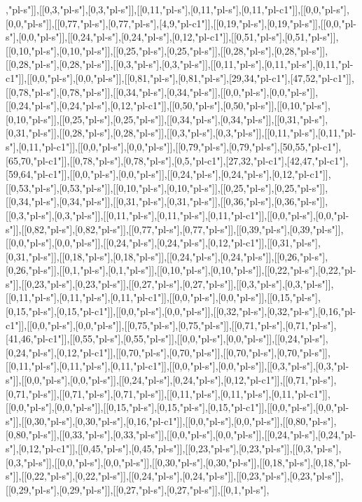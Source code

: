 ,"pl-s"]],[[0,3,"pl-s"],[0,3,"pl-s"]],[[0,11,"pl-s"],[0,11,"pl-s"],[0,11,"pl-c1"]],[[0,0,"pl-s"],[0,0,"pl-s"]],[[0,77,"pl-s"],[0,77,"pl-s"],[4,9,"pl-c1"]],[[0,19,"pl-s"],[0,19,"pl-s"]],[[0,0,"pl-s"],[0,0,"pl-s"]],[[0,24,"pl-s"],[0,24,"pl-s"],[0,12,"pl-c1"]],[[0,51,"pl-s"],[0,51,"pl-s"]],[[0,10,"pl-s"],[0,10,"pl-s"]],[[0,25,"pl-s"],[0,25,"pl-s"]],[[0,28,"pl-s"],[0,28,"pl-s"]],[[0,28,"pl-s"],[0,28,"pl-s"]],[[0,3,"pl-s"],[0,3,"pl-s"]],[[0,11,"pl-s"],[0,11,"pl-s"],[0,11,"pl-c1"]],[[0,0,"pl-s"],[0,0,"pl-s"]],[[0,81,"pl-s"],[0,81,"pl-s"],[29,34,"pl-c1"],[47,52,"pl-c1"]],[[0,78,"pl-s"],[0,78,"pl-s"]],[[0,34,"pl-s"],[0,34,"pl-s"]],[[0,0,"pl-s"],[0,0,"pl-s"]],[[0,24,"pl-s"],[0,24,"pl-s"],[0,12,"pl-c1"]],[[0,50,"pl-s"],[0,50,"pl-s"]],[[0,10,"pl-s"],[0,10,"pl-s"]],[[0,25,"pl-s"],[0,25,"pl-s"]],[[0,34,"pl-s"],[0,34,"pl-s"]],[[0,31,"pl-s"],[0,31,"pl-s"]],[[0,28,"pl-s"],[0,28,"pl-s"]],[[0,3,"pl-s"],[0,3,"pl-s"]],[[0,11,"pl-s"],[0,11,"pl-s"],[0,11,"pl-c1"]],[[0,0,"pl-s"],[0,0,"pl-s"]],[[0,79,"pl-s"],[0,79,"pl-s"],[50,55,"pl-c1"],[65,70,"pl-c1"]],[[0,78,"pl-s"],[0,78,"pl-s"],[0,5,"pl-c1"],[27,32,"pl-c1"],[42,47,"pl-c1"],[59,64,"pl-c1"]],[[0,0,"pl-s"],[0,0,"pl-s"]],[[0,24,"pl-s"],[0,24,"pl-s"],[0,12,"pl-c1"]],[[0,53,"pl-s"],[0,53,"pl-s"]],[[0,10,"pl-s"],[0,10,"pl-s"]],[[0,25,"pl-s"],[0,25,"pl-s"]],[[0,34,"pl-s"],[0,34,"pl-s"]],[[0,31,"pl-s"],[0,31,"pl-s"]],[[0,36,"pl-s"],[0,36,"pl-s"]],[[0,3,"pl-s"],[0,3,"pl-s"]],[[0,11,"pl-s"],[0,11,"pl-s"],[0,11,"pl-c1"]],[[0,0,"pl-s"],[0,0,"pl-s"]],[[0,82,"pl-s"],[0,82,"pl-s"]],[[0,77,"pl-s"],[0,77,"pl-s"]],[[0,39,"pl-s"],[0,39,"pl-s"]],[[0,0,"pl-s"],[0,0,"pl-s"]],[[0,24,"pl-s"],[0,24,"pl-s"],[0,12,"pl-c1"]],[[0,31,"pl-s"],[0,31,"pl-s"]],[[0,18,"pl-s"],[0,18,"pl-s"]],[[0,24,"pl-s"],[0,24,"pl-s"]],[[0,26,"pl-s"],[0,26,"pl-s"]],[[0,1,"pl-s"],[0,1,"pl-s"]],[[0,10,"pl-s"],[0,10,"pl-s"]],[[0,22,"pl-s"],[0,22,"pl-s"]],[[0,23,"pl-s"],[0,23,"pl-s"]],[[0,27,"pl-s"],[0,27,"pl-s"]],[[0,3,"pl-s"],[0,3,"pl-s"]],[[0,11,"pl-s"],[0,11,"pl-s"],[0,11,"pl-c1"]],[[0,0,"pl-s"],[0,0,"pl-s"]],[[0,15,"pl-s"],[0,15,"pl-s"],[0,15,"pl-c1"]],[[0,0,"pl-s"],[0,0,"pl-s"]],[[0,32,"pl-s"],[0,32,"pl-s"],[0,16,"pl-c1"]],[[0,0,"pl-s"],[0,0,"pl-s"]],[[0,75,"pl-s"],[0,75,"pl-s"]],[[0,71,"pl-s"],[0,71,"pl-s"],[41,46,"pl-c1"]],[[0,55,"pl-s"],[0,55,"pl-s"]],[[0,0,"pl-s"],[0,0,"pl-s"]],[[0,24,"pl-s"],[0,24,"pl-s"],[0,12,"pl-c1"]],[[0,70,"pl-s"],[0,70,"pl-s"]],[[0,70,"pl-s"],[0,70,"pl-s"]],[[0,11,"pl-s"],[0,11,"pl-s"],[0,11,"pl-c1"]],[[0,0,"pl-s"],[0,0,"pl-s"]],[[0,3,"pl-s"],[0,3,"pl-s"]],[[0,0,"pl-s"],[0,0,"pl-s"]],[[0,24,"pl-s"],[0,24,"pl-s"],[0,12,"pl-c1"]],[[0,71,"pl-s"],[0,71,"pl-s"]],[[0,71,"pl-s"],[0,71,"pl-s"]],[[0,11,"pl-s"],[0,11,"pl-s"],[0,11,"pl-c1"]],[[0,0,"pl-s"],[0,0,"pl-s"]],[[0,15,"pl-s"],[0,15,"pl-s"],[0,15,"pl-c1"]],[[0,0,"pl-s"],[0,0,"pl-s"]],[[0,30,"pl-s"],[0,30,"pl-s"],[0,16,"pl-c1"]],[[0,0,"pl-s"],[0,0,"pl-s"]],[[0,80,"pl-s"],[0,80,"pl-s"]],[[0,33,"pl-s"],[0,33,"pl-s"]],[[0,0,"pl-s"],[0,0,"pl-s"]],[[0,24,"pl-s"],[0,24,"pl-s"],[0,12,"pl-c1"]],[[0,45,"pl-s"],[0,45,"pl-s"]],[[0,23,"pl-s"],[0,23,"pl-s"]],[[0,3,"pl-s"],[0,3,"pl-s"]],[[0,0,"pl-s"],[0,0,"pl-s"]],[[0,30,"pl-s"],[0,30,"pl-s"]],[[0,18,"pl-s"],[0,18,"pl-s"]],[[0,22,"pl-s"],[0,22,"pl-s"]],[[0,24,"pl-s"],[0,24,"pl-s"]],[[0,23,"pl-s"],[0,23,"pl-s"]],[[0,29,"pl-s"],[0,29,"pl-s"]],[[0,27,"pl-s"],[0,27,"pl-s"]],[[0,1,"pl-s"],